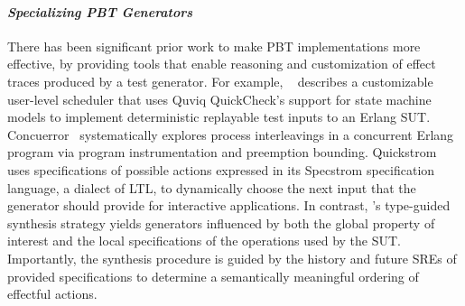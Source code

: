\paragraph{{\it Specializing PBT Generators}}
There has been significant prior work to make PBT implementations more
effective, by providing tools that enable reasoning and customization
of effect traces produced by a test generator.  For example,
~\citet{CP+09} describes a customizable user-level scheduler that uses
Quviq QuickCheck's support for state machine models to implement
deterministic replayable test inputs to an Erlang SUT.
Concuerror~\cite{CGS13} systematically explores process interleavings
in a concurrent Erlang program via program instrumentation and
preemption bounding.  Quickstrom~\cite{Quickstrom} uses specifications
of possible actions expressed in its Specstrom specification language,
a dialect of LTL, to dynamically choose the next input that the
generator should provide for interactive applications.  In contrast,
\name{}'s type-guided synthesis strategy yields
generators influenced by both the global property of interest and the
local \tyName{} specifications of the operations used by the SUT.
Importantly, the synthesis procedure is guided by the history and
future SREs of provided specifications to determine a semantically
meaningful ordering of effectful actions.

